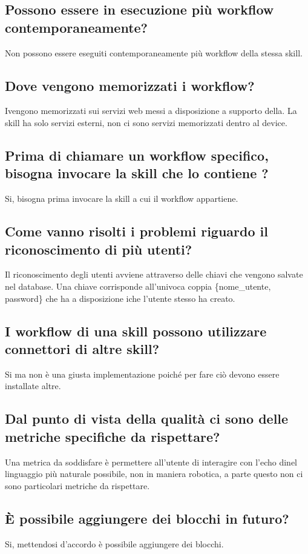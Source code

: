 \documentclass[a4paper,12pt]{article}
\begin{document}
	\subsection{Possono essere in esecuzione più workflow contemporaneamente?}
	Non possono essere eseguiti contemporaneamente più workflow della stessa skill.
	\subsection{Dove vengono memorizzati i workflow?}
	Ivengono memorizzati sui servizi web messi a disposizione a supporto della. La skill ha solo servizi esterni, non ci sono servizi memorizzati dentro al device. 
	\subsection{Prima di chiamare un workflow specifico, bisogna invocare la skill che lo contiene ?}
	Si, bisogna prima invocare la skill a cui il workflow appartiene.
	\subsection{Come vanno risolti i problemi riguardo il riconoscimento di più utenti?}
	Il riconoscimento degli utenti avviene attraverso delle chiavi che vengono salvate nel database. Una chiave corrisponde all'univoca coppia \{nome\_utente, password\} che ha a disposizione iche l'utente stesso  ha creato.
	\subsection{I workflow di una skill possono utilizzare connettori  di altre skill?}
	Si ma non è una giusta implementazione poiché per fare ciò devono essere installate altre.
    \subsection{Dal punto di vista della qualità ci sono delle metriche specifiche da rispettare?}
    Una metrica da soddisfare è permettere all'utente di interagire con l'echo dinel linguaggio più naturale possibile, non in maniera robotica, a parte questo non ci sono particolari metriche da rispettare.
    \subsection{È possibile aggiungere dei blocchi in futuro?}
    Si, mettendosi d'accordo è possibile aggiungere dei blocchi.
		\label{LastPage}
\end{document}
